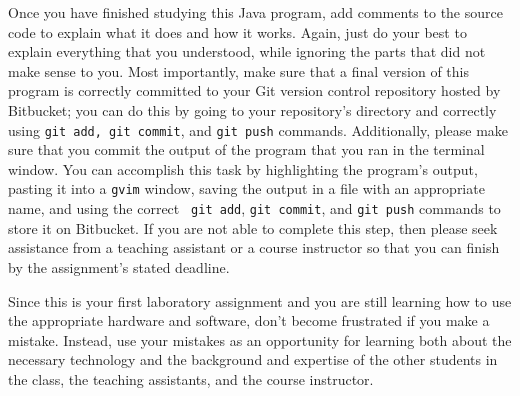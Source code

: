 Once you have finished studying this Java program, add comments to the source code to explain what it does and how it
works.  Again, just do your best to explain everything that you understood, while ignoring the parts that did not make
sense to you.  Most importantly, make sure that a final version of this program is correctly committed to your Git
version control repository hosted by Bitbucket; you can do this by going to your repository's directory and correctly
using {\tt git add, git commit}, and {\tt git push} commands. Additionally, please make sure that you commit the output
of the program that you ran in the terminal window.  You can accomplish this task by highlighting the program's output,
pasting it into a {\tt gvim} window, saving the output in a file with an appropriate name, and using the correct {\tt
git add}, {\tt git commit}, and {\tt git push} commands to store it on Bitbucket.  If you are not able to complete this
step, then please seek assistance from a teaching assistant or a course instructor so that you can finish by the
assignment's stated deadline.

Since this is your first laboratory assignment and you are still learning how to use the appropriate hardware and
software, don't become frustrated if you make a mistake. Instead, use your mistakes as an opportunity for learning both
about the necessary technology and the background and expertise of the other students in the class, the teaching
assistants, and the course instructor.



